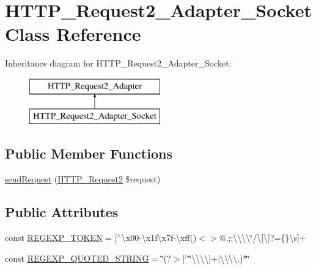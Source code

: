 \hypertarget{classHTTP__Request2__Adapter__Socket}{}\section{H\+T\+T\+P\+\_\+\+Request2\+\_\+\+Adapter\+\_\+\+Socket Class Reference}
\label{classHTTP__Request2__Adapter__Socket}
Inheritance diagram for H\+T\+T\+P\+\_\+\+Request2\+\_\+\+Adapter\+\_\+\+Socket\+:\begin{figure}[H]
\begin{center}
\leavevmode
\includegraphics[height=2.000000cm]{classHTTP__Request2__Adapter__Socket}
\end{center}
\end{figure}
\subsection*{Public Member Functions}
\begin{DoxyCompactItemize}
\item 
\hyperlink{classHTTP__Request2__Adapter__Socket_ac601f7f165d0771e38f680a1f159fe79}{send\+Request} (\hyperlink{classHTTP__Request2}{H\+T\+T\+P\+\_\+\+Request2} \$request)
\end{DoxyCompactItemize}
\subsection*{Public Attributes}
\begin{DoxyCompactItemize}
\item 
const \hyperlink{classHTTP__Request2__Adapter__Socket_a56beacc9218c6048c7f9ad5af80959eb}{R\+E\+G\+E\+X\+P\+\_\+\+T\+O\+K\+EN} = \textquotesingle{}\mbox{[}$^\wedge$\textbackslash{}x00-\/\textbackslash{}x1f\textbackslash{}x7f-\/\textbackslash{}xff()$<$$>$@,;\+:\textbackslash{}\textbackslash{}\textbackslash{}\textbackslash{}\char`\"{}/\textbackslash{}\mbox{[}\textbackslash{}\mbox{]}?=\{\}\textbackslash{}s\mbox{]}+\textquotesingle{}
\item 
const \hyperlink{classHTTP__Request2__Adapter__Socket_a6c107bbe3366105b84ab79ccedda35c9}{R\+E\+G\+E\+X\+P\+\_\+\+Q\+U\+O\+T\+E\+D\+\_\+\+S\+T\+R\+I\+NG} = \textquotesingle{}\char`\"{}(?$>$\mbox{[}$^\wedge$\char`\"{}\textbackslash{}\textbackslash{}\textbackslash{}\textbackslash{}\mbox{]}+$\vert$\textbackslash{}\textbackslash{}\textbackslash{}\textbackslash{}.)$\ast$\char`\"{}\textquotesingle{}
\end{DoxyCompactItemize}
